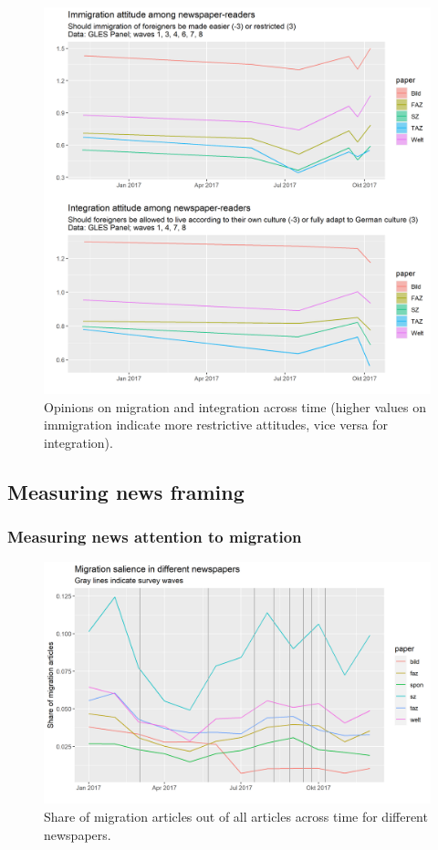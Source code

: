 \documentclass{article}
\begin{document}
\begin{figure}[!ht]
    \centering
    \includegraphics[width=\textwidth]{paper/vis/issues_readers.png}
    \caption{Opinions on migration and integration across time (higher values on immigration indicate more restrictive attitudes, vice versa for integration).}
    \label{fig:issues}
\end{figure}


\subsection{Measuring news framing}

\subsubsection{Measuring news attention to migration}

\begin{figure}[!ht]
    \centering
    \includegraphics[width=\textwidth]{paper/vis/salience_papers_focus.png}
    \caption{Share of migration articles out of all articles across time for different newspapers.}
    \label{fig:salience}
\end{figure}
\end{document}

